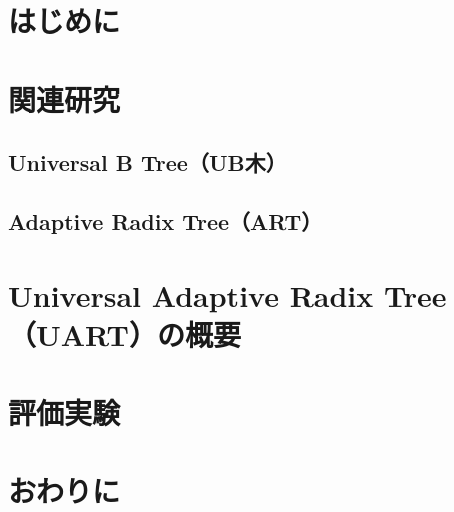 
\section{はじめに}






\section{関連研究}

\subsection{Universal B Tree（UB木）}


\subsection{Adaptive Radix Tree（ART）}






\section{Universal Adaptive Radix Tree（UART）の概要}






\section{評価実験}






\section{おわりに}





